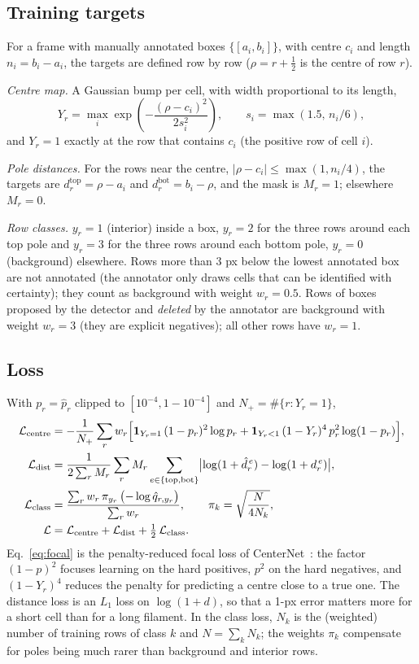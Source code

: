 \documentclass[11pt,a4paper]{article}
\newcommand{\ind}{\mathbf{1}}
\newcommand{\hatp}{\hat p}
\begin{document}
\subsection{Training targets}
For a frame with manually annotated boxes $\{[a_i,b_i]\}$, with centre $c_i$ and length $n_i=b_i-a_i$, the targets are defined row by row ($\rho=r+\tfrac12$ is the centre of row $r$).

\emph{Centre map.} A Gaussian bump per cell, with width proportional to its length,
\begin{equation}
Y_r=\max_i \exp\!\left(-\frac{(\rho-c_i)^2}{2s_i^2}\right),\qquad s_i=\max(1.5,\,n_i/6),
\end{equation}
and $Y_r=1$ exactly at the row that contains $c_i$ (the positive row of cell $i$).

\emph{Pole distances.} For the rows near the centre, $|\rho-c_i|\le\max(1,n_i/4)$, the targets are $d^{\mathrm{top}}_r=\rho-a_i$ and $d^{\mathrm{bot}}_r=b_i-\rho$, and the mask is $M_r=1$; elsewhere $M_r=0$.

\emph{Row classes.} $y_r=1$ (interior) inside a box, $y_r=2$ for the three rows around each top pole and $y_r=3$ for the three rows around each bottom pole, $y_r=0$ (background) elsewhere. Rows more than 3 px below the lowest annotated box are not annotated (the annotator only draws cells that can be identified with certainty); they count as background with weight $w_r=0.5$. Rows of boxes proposed by the detector and \emph{deleted} by the annotator are background with weight $w_r=3$ (they are explicit negatives); all other rows have $w_r=1$.

\subsection{Loss}
With $p_r=\hatp_r$ clipped to $[10^{-4},1-10^{-4}]$ and $N_+=\#\{r:Y_r=1\}$,
\begin{align}
\mathcal L_{\mathrm{centre}}&=-\frac{1}{N_+}\sum_r w_r\Bigl[\ind_{Y_r=1}\,(1-p_r)^2\log p_r+\ind_{Y_r<1}\,(1-Y_r)^4\,p_r^2\log(1-p_r)\Bigr],\label{eq:focal}\\
\mathcal L_{\mathrm{dist}}&=\frac{1}{2\sum_r M_r}\sum_r M_r\sum_{e\in\{\mathrm{top},\mathrm{bot}\}}\bigl|\log(1+\hat d^{\,e}_r)-\log(1+d^{\,e}_r)\bigr|,\\
\mathcal L_{\mathrm{class}}&=\frac{\sum_r w_r\,\pi_{y_r}\,\bigl(-\log\hat q_{r,y_r}\bigr)}{\sum_r w_r},\qquad \pi_k=\sqrt{\frac{N}{4N_k}},\\
\mathcal L&=\mathcal L_{\mathrm{centre}}+\mathcal L_{\mathrm{dist}}+\tfrac12\,\mathcal L_{\mathrm{class}}.
\end{align}
Eq.~\eqref{eq:focal} is the penalty-reduced focal loss of CenterNet~\cite{lin2017,zhou2019}: the factor $(1-p)^2$ focuses learning on the hard positives, $p^2$ on the hard negatives, and $(1-Y_r)^4$ reduces the penalty for predicting a centre close to a true one. The distance loss is an $L_1$ loss on $\log(1+d)$, so that a 1-px error matters more for a short cell than for a long filament. In the class loss, $N_k$ is the (weighted) number of training rows of class $k$ and $N=\sum_kN_k$; the weights $\pi_k$ compensate for poles being much rarer than background and interior rows.
\end{document}
